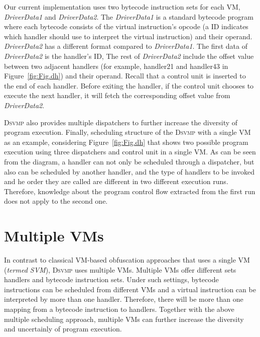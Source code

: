 \documentclass[preprint,12pt,3p]{elsarticle}
\newcommand{\DSVMP}{\textsc{Dsvmp}\xspace}
\begin{document}
Our current implementation uses two bytecode instruction sets for each VM,
\emph{DriverData1} and \emph{DriverData2}. The \emph{DriverData1} is a
standard bytecode program where each bytecode consists of the
virtual instruction's opcode (a ID indicates which handler should use to
interpret the virtual instruction) and their operand. \emph{DriverData2} has a different
format compared to \emph{DriverData1}. The first data of \emph{DriverData2}
is the handler's ID, The rest of \emph{DriverData2} include the
offset value between two adjacent handlers (for example, handler21 and handler43 in Figure~\ref{fig:Fig.dh}) and their operand.
Recall that a control unit is inserted to the end of each handler. Before exiting the handler,
if the control unit chooses to execute the next handler, it will fetch the corresponding offset value from \emph{DriverData2}.

\DSVMP also provides multiple dispatchers to further increase the diversity of program execution.
Finally, scheduling structure of the \DSVMP with a single VM as an example, considering Figure~\ref{fig:Fig.dh} that
shows two possible program execution using three dispatchers and control unit in a single VM. As can be seen
from the diagram, a handler can not only be scheduled through a dispatcher, but also can be scheduled by another handler,
and the type of handlers to be invoked and he order they are called are different in two different execution runs.
Therefore, knowledge about the program control flow extracted from the first run does not apply to the second one.


\section{Multiple VMs}\label{sec:mvm}
In contrast to classical VM-based obfuscation approaches that uses a single VM (\emph{termed SVM}), \DSVMP uses multiple VMs.
Multiple VMs offer different sets handlers and bytecode instruction sets. Under such settings,
bytecode instructions can be scheduled from different VMs and a virtual instruction can be interpreted by more than one handler.
Therefore, there will be more than one mapping from a bytecode instruction to handlers.
Together with the above multiple scheduling approach, multiple VMs can further increase the diversity and uncertainly of program execution.
\end{document}
